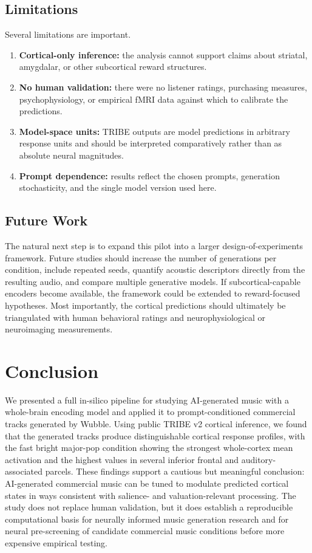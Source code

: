 \documentclass[conference]{IEEEtran}
\begin{document}
\subsection{Limitations}

Several limitations are important.
\begin{enumerate}
    \item \textbf{Cortical-only inference:} the analysis cannot support claims about striatal, amygdalar, or other subcortical reward structures.
    \item \textbf{No human validation:} there were no listener ratings, purchasing measures, psychophysiology, or empirical fMRI data against which to calibrate the predictions.
    \item \textbf{Model-space units:} TRIBE outputs are model predictions in arbitrary response units and should be interpreted comparatively rather than as absolute neural magnitudes.
    \item \textbf{Prompt dependence:} results reflect the chosen prompts, generation stochasticity, and the single model version used here.
\end{enumerate}

\subsection{Future Work}

The natural next step is to expand this pilot into a larger design-of-experiments framework. Future studies should increase the number of generations per condition, include repeated seeds, quantify acoustic descriptors directly from the resulting audio, and compare multiple generative models. If subcortical-capable encoders become available, the framework could be extended to reward-focused hypotheses. Most importantly, the cortical predictions should ultimately be triangulated with human behavioral ratings and neurophysiological or neuroimaging measurements.

\section{Conclusion}

We presented a full in-silico pipeline for studying AI-generated music with a whole-brain encoding model and applied it to prompt-conditioned commercial tracks generated by Wubble. Using public TRIBE v2 cortical inference, we found that the generated tracks produce distinguishable cortical response profiles, with the fast bright major-pop condition showing the strongest whole-cortex mean activation and the highest values in several inferior frontal and auditory-associated parcels. These findings support a cautious but meaningful conclusion: AI-generated commercial music can be tuned to modulate predicted cortical states in ways consistent with salience- and valuation-relevant processing. The study does not replace human validation, but it does establish a reproducible computational basis for neurally informed music generation research and for neural pre-screening of candidate commercial music conditions before more expensive empirical testing.
\end{document}

